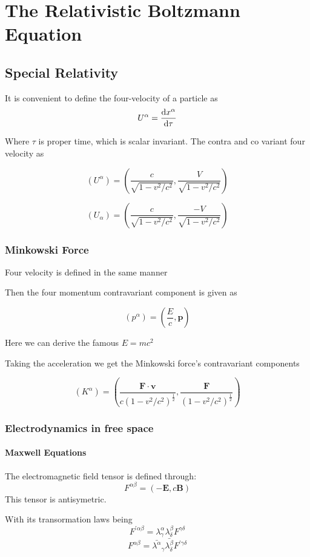 \chapter{The Relativistic Boltzmann Equation}

\section{Special Relativity}

It is convenient to define the four-velocity of a particle as
\[
U^\alpha = \dv{x^\alpha}{\tau}
  \]

  Where $\tau$ is proper time, which is scalar invariant. The contra and co variant four velocity as

\[
(U^\alpha) = \left(\frac{c}{\sqrt{1-v^2/c^2}}, \frac{V}{\sqrt{1-v^2/c^2}} \right)
  \]

  \[
(U_\alpha) = \left(\frac{c}{\sqrt{1-v^2/c^2}}, \frac{-V}{\sqrt{1-v^2/c^2}} \right)
  \]

\subsection{Minkowski Force}

Four velocity is defined in the same manner

Then the four momentum contravariant component is given as

\[
(p^\alpha) = (\frac{E}{c}, \mathbf{p})
  \]

  Here we can derive the famous $E=mc^2$

  Taking the acceleration we get the Minkowski force's contravariant components

\[
    (K^\alpha) = (\frac{\mathbf{F} \cdot \mathbf{v}}{c(1-v^2/c^2)^{\frac{1}{2}}},\frac{\mathbf{F}}{(1-v^2/c^2)^{\frac{1}{2}}} )
 \]

\subsection{Electrodynamics in free space}

\subsubsection{Maxwell Equations}

The electromagnetic field tensor is defined through:
\[
F^{\alpha \beta} = (-\mathbf{E},c \mathbf{B})
  \]
  This tensor is antisymetric.

  With its transormation laws being
\[
    F^{'\alpha \beta} = \lambda^\alpha_\gamma \lambda_\delta^\beta F^{\gamma \delta}  \]
\[
    F^{\alpha \beta} = \bar{\lambda^\alpha}_\gamma \bar{\lambda_\delta^\beta} F^{'\gamma \delta}
  \]

